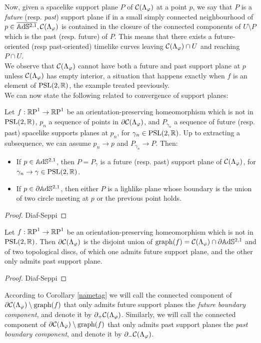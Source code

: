 Now, given a spacelike support plane $P$ of $\CF$ at a point $p$, we say that $P$ is a \textit{future} (resp. \textit{past}) support plane if in a small simply connected neighbourhood of
$p\in\overline{\A^{2,1}}, \CF$ is contained in the closure of the connected components of $U\setminus P$ which is the past (resp. future) of $P$. This means that there exists a future-oriented (resp past-oriented) timelike curves leaving $\CF\cap U$ and reaching $P\cap U$. \\
We observe that $\CF$ cannot have both a future and past support plane at $p$ unless $\CF$ has empty interior, a situation that happens exactly when $f$ is an element of $\PSL$, the example treated previously.\\
We can now state the following related to convergence of support planes: 
\begin{lemma}\label{49}
    Let $f:\S\to\S$ be an orientation-preserving homeomorphism which is not in $\PSL$, $p_n$ a sequence of points in $\partial\CF$, and $P_{\gamma_n}$ a sequence of future (resp. past) spacelike supports planes at $p_n$, for $\gamma_n\in\PSL$. Up to extracting a subsequence, we can assume $p_n\to p$ and $P_{\gamma_n}\to P.$ Then: 
    \begin{itemize}
        \item If $p\in\A^{2,1}$, then $P=P_\gamma$ is a future (resp. past) support plane of $\CF$, for $\gamma_n\to\gamma\in\PSL$.
        \item If $p\in\partial\A^{2,1}$, then either $P$ is a lighlike plane whose boundary is the union of two circle meeting at $p$ or the previous point holds.        
    \end{itemize}
\end{lemma}
\begin{proof}
    Diaf-Seppi
\end{proof}
\begin{corollary}\label{nametag}
    Let $f:\S\to\S$ be an orientation-preserving homeomorphism which is not in $\PSL$. Then $\partial\CF$ is the disjoint union of $\text{graph}(f)=\CF\cap\partial\A^{2,1}$ and of two topological discs, of which one admits future support plane, and the other only admits past support plane. 
\end{corollary}
\begin{proof}
    Diaf-Seppi
\end{proof}

According to Corollary \ref{nametag} we will call the connected component of $\partial\CF\setminus\text{graph}(f)$ that only admits future support planes the \textit{future boundary component}, and denote it by $\partial_+\CF$. Similarly, we will call the connected component of $\partial\CF\setminus\text{graph}(f)$ that only admits past support planes the \textit{past boundary component}, and denote it by $\partial_-\CF$.\\

